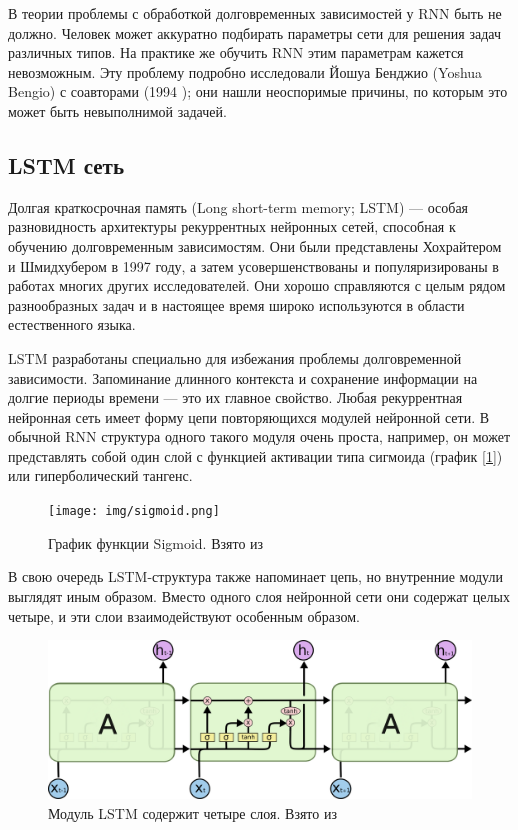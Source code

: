 \documentclass[14pt]{extarticle}
\begin{document}
В теории проблемы с обработкой долговременных зависимостей у RNN быть не должно. Человек может аккуратно подбирать параметры сети для решения задач различных типов. На практике же обучить RNN этим параметрам кажется невозможным. Эту проблему подробно исследовали Йошуа Бенджио (Yoshua Bengio) с соавторами (1994 \cite{Bengio}); они нашли неоспоримые причины, по которым это может быть невыполнимой задачей.

\subsection{LSTM сеть}

Долгая краткосрочная память (Long short-term memory; LSTM) --- особая разновидность архитектуры рекуррентных нейронных сетей, способная к обучению долговременным зависимостям. Они были представлены Хохрайтером и Шмидхубером в 1997 \cite{Hochreiter} году, а затем усовершенствованы и популяризированы в работах многих других исследователей. Они хорошо справляются с целым рядом разнообразных задач и в настоящее время широко используются в области естественного языка.

LSTM разработаны специально для избежания проблемы долговременной зависимости. Запоминание длинного контекста и сохранение информации на долгие периоды времени --- это их главное свойство. Любая рекуррентная нейронная сеть имеет форму цепи повторяющихся модулей нейронной сети. В обычной RNN структура одного такого модуля очень проста, например, он может представлять собой один слой с функцией активации типа сигмоида (график [\ref{fig:sigmoid}]) или гиперболический тангенс.

\begin{figure}[h]
	\centering
	\texttt{[image: img/sigmoid.png]}
	\caption{График функции Sigmoid. Взято из \cite{Sigmoid-Wiki}}
	\label{fig:sigmoid}
\end{figure}


В свою очередь LSTM-структура также напоминает цепь, но внутренние модули выглядят иным образом. Вместо одного слоя нейронной сети они содержат целых четыре, и эти слои взаимодействуют особенным образом. 

\begin{figure}[h]
	\centering
	\includegraphics[width=1\textwidth]{img/LSTM-chain.png}
	\caption{Модуль LSTM содержит четыре слоя. Взято из \cite{Colah}}
	\label{fig:lstm}
\end{figure}
\end{document}
